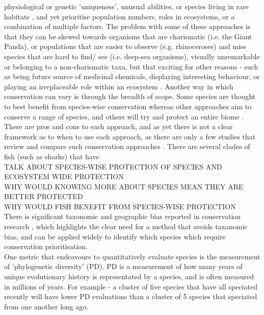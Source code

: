 \documentclass[11pt]{article}
\begin{document}
physiological or genetic 'uniqueness', unusual abilities, or species living in 
rare habitats \autocite{Brooks2006}, and yet prioritise population numbers, 
roles in ecosystems, or a combination of multiple factors. The problem with 
some of these approaches is that they can be skewed towards organisms that are  
charismatic (i.e. the 
Giant Panda), or populations that are easier to observe (e.g. rhinoceroses) and 
miss species that are hard to find/ see (i.e. deep-sea organisms), visually 
unremarkable or belonging to a non-charismatic taxa, but that exciting for 
other reasons 
- such as being future source of medicinal chemicals, displaying interesting 
behaviour, or playing an irreplaceable role within an ecosystem
\autocite{Clark2002}.  Another way in which conservation can vary is through 
the breadth of scope. Some species are thought to best benefit from 
species-wise conservation \autocite{} whereas other approaches aim to conserve 
a range of species, and others will try and protect an entire biome 
\autocite{something about the rainforest}. There are pros and cons to each 
approach, and as yet there is not a clear framework as to when to use each 
approach, as there are only a few studies that review and compare such 
conservation approaches \autocite{find a lot more citations}. There are several 
clades of fish (such as sharks) that have 
\\ 	TALK ABOUT SPECIES-WISE PROTECTION OF SPECIES AND ECOSYSTEM WIDE PROTECTION
\\ WHY WOULD KNOWING MORE ABOUT SPECIES MEAN THEY ARE BETTER PROTECTED
\\ WHY WOULD FISH BENEFIT FROM SPECIES-WISE PROTECTION
\\

There is significant taxonomic and geographic bias 
reported in conservation research \autocite{Clark2002, Darwall2011, 
Watson2017}, which highlights the clear need for a method that avoids 
taxanomic bias, and can be applied widely to identify which species which 
require conservation 
prioritisation. \\

One metric that endeavours to quantitatively evaluate species is the 
measurement of 'phylogenetic diversity' (PD). PD is a measurement of how many 
years of unique evolutionary history is representated by a species, and is 
often measured in millions of years. For example - a cluster of five species 
that have all speciated recently will have lower PD evaluations than a cluster 
of 5 species that speciated from one another long ago. 
\end{document}

